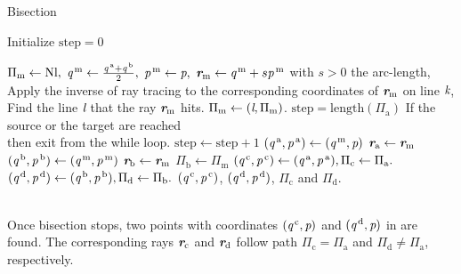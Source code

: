 \begin{algorithm}
\caption{Bisection}\label{alg:bisection}
Initialize $\textrm{step} = 0$
\begin{algorithmic}[1]
\State $\Pi_{\textrm{m}}\gets \textrm{Nl},$
\State $\textit{q}^{\,\textrm{m}}\gets \frac{\textit{q}^{\,\textrm{a}}+\textit{q}^{\,\textrm{b}}}{2},$ 
\State $\textit{p}^{\,\textrm{m}}\gets\textit{p},$
\State $\textit{\textbf{r}}_{\textrm{m}}\gets \textit{q}^{\,\textrm{m}}+s \textit{p}^{\,\textrm{m}}$ with $s>0$ the arc-length,
\State Apply the inverse of ray tracing to the corresponding coordinates of $\textit{\textbf{r}}_{\textrm{m}}$ on line $\textit{k}$,
\State Find the line $\textit{l}$ that the ray $\textit{\textbf{r}}_{\textrm{m}}$ hits.
\State $\Pi_{\textrm{m}}\gets (\textit{l},\Pi_{\textrm{m}})$.
\State $\textrm{step} = \mbox{length}(\Pi_\textrm{a})$ \Comment If the source or the target are reached \\  \Comment then exit from the while loop.
\Else \State $\textrm{step}\gets\textrm{step}+1$ 
\EndIf
\EndWhile
{}
\State $(\textit{q}^{\,\textrm{a}}, \textit{p}^{\,\textrm{a}})\gets (\textit{q}^{\,\textrm{m}}, \textit{p})$
\State $\textit{\textbf{r}}_{\textrm{a}}\gets \textit{\textbf{r}}_{\textrm{m}}$
\Else 
\State $(\textit{q}^{\,\textrm{b}}, \textit{p}^{\,\textrm{b}})\gets (\textit{q}^{\,\textrm{m}}, \textit{p}^{\,\textrm{m}})$
\State $\textit{\textbf{r}}_{\textrm{b}}\gets \textit{\textbf{r}}_{\textrm{m}}$
\State $\Pi_\textrm{b}\gets \Pi_{\textrm{m}}$
\EndIf
\EndWhile
\State $(\textit{q}^{\,\textrm{c}}, \textit{p}^{\,\textrm{c}})\gets (\textit{q}^{\,\textrm{a}}, \textit{p}^{\,\textrm{a}}), \Pi_\textrm{c}\gets \Pi_{\textrm{a}}.$
\State $(\textit{q}^{\,\textrm{d}}, \textit{p}^{\,\textrm{d}})\gets (\textit{q}^{\,\textrm{b}}, \textit{p}^{\,\textrm{b}}), \Pi_\textrm{d}\gets \Pi_{\textrm{b}}.$
\State \Return $(\textit{q}^{\,\textrm{c}}, \textit{p}^{\,\textrm{c}})$, $(\textit{q}^{\,\textrm{d}}, \textit{p}^{\,\textrm{d}})$, $\Pi_{\textrm{c}}$ and $\Pi_{\textrm{d}}$.
\end{algorithmic}
\end{algorithm}
\\ \indent Once bisection stops, two points with coordinates $(\textit{q}^{\,\textrm{c}}, \textit{p})$ and $(\textit{q}^{\,\textrm{d}}, \textit{p})$ in  are found. The corresponding rays $\textit{\textbf{r}}_{\textrm{c}}$ and $\textit{\textbf{r}}_{\textrm{d}}$ follow path $\Pi_{\textrm{c}}=\Pi_{\textrm{a}}$ and $\Pi_{\textrm{d}}\neq\Pi_{\textrm{a}}$, respectively. 
